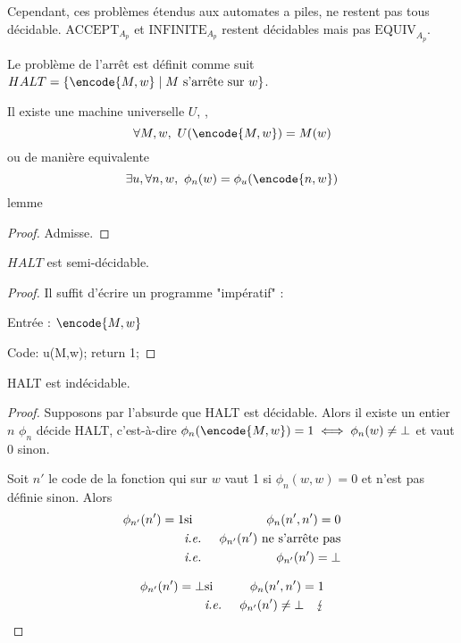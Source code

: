 Cependant, ces problèmes étendus aux automates a piles, ne restent pas tous décidable.
$\text{ACCEPT}_{A_p}$ et $\text{INFINITE}_{A_p}$ restent décidables mais pas $\text{EQUIV}_{A_p}$.

\begin{definition}
	Le problème de l'arrêt est définit comme suit $HALT = \setdef {\encode{M,w}} {M \text{ s'arrête sur } w}$.
\end{definition}

\begin{lemme}
	Il existe une machine universelle $U$, \ie, $$\forall M,w, \  U (\encode {M,w}) = M (w)$$
	ou de manière equivalente
	$$\exists u, \forall n,w, \ \phi_n(w) = \phi_u(\encode {n,w})$$
	lemme\end{lemme}

\begin{proof}
	Admisse.
\end{proof}

\begin{prop}
	$HALT$ est semi-décidable.
\end{prop}

\begin{proof}
	Il suffit d'écrire un programme "impératif" :

	Entrée : $\encode {M,w}$

	Code:
	u(M,w);
	return 1;

\end{proof}

\begin{prop}
	HALT est indécidable.
\end{prop}

\begin{proof}
	Supposons par l'absurde que HALT est décidable. Alors il existe un entier $n$ \tq $\phi_n$ décide HALT, c'est-à-dire
	$ \phi_n(\encode {M, w} ) = 1 \iff \phi_n(w) \neq \bot $ et vaut $0$ sinon.

	Soit $n'$ le code de la fonction qui sur $w$ vaut 1 si $\phi_n (w,w) = 0 $ et n'est pas définie sinon. Alors
	\begin{eqnarray*}
		\phi_{n'}(n') = 1 & \text{si} & \phi_n(n',n') = 0\\
		&\text{\textit{i.e.} }& \phi_{n'}(n') \text{ ne s'arrête pas} \\
		&\text{\textit{i.e.} }& \phi_{n'}(n') = \bot
	\end{eqnarray*}


	\begin{eqnarray*}
		\phi_{n'}(n') = \bot & \text{si} & \phi_n(n',n') = 1\\
		&\text{\textit{i.e.} }& \phi_{n'}(n') \neq \bot \quad \lightning
	\end{eqnarray*}

\end{proof}
